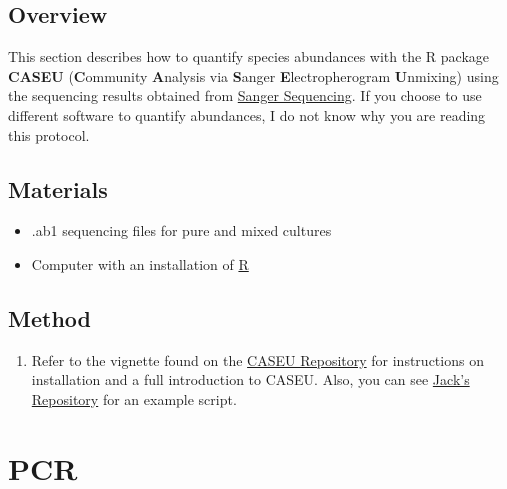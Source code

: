 \documentclass[twocolumn]{article}
\begin{document}
\subsection{Overview}
This section describes how to quantify species abundances with the R package \textbf{CASEU}
(\textbf{C}ommunity \textbf{A}nalysis via \textbf{S}anger \textbf{E}lectropherogram \textbf{U}nmixing)
\cite{Cermak_2020}
using the sequencing results obtained from \hyperref[SS]{Sanger Sequencing}.
If you choose to use different software to quantify abundances,
I do not know why you are reading this protocol.

\subsection{Materials}
\begin{itemize}
  \item .ab1 sequencing files for pure and mixed cultures
  \item Computer with an installation of \href{https://www.r-project.org}{R}
\end{itemize}

\subsection{Method}
\begin{enumerate}
  \item Refer to the vignette found on the \href{https://htmlpreview.github.io/?https://bitbucket.org/dattamanoshi/caseu/raw/master/doc/CASEU_Vignette.html}{CASEU Repository} for instructions on installation and a full introduction to CASEU. Also, you can see \href{https://github.com/jpsco5890/quantify_16S_ratios.git}{Jack's Repository} for an example script.
\end{enumerate}

\appendix
\section{PCR}\label{aA}
\end{document}
